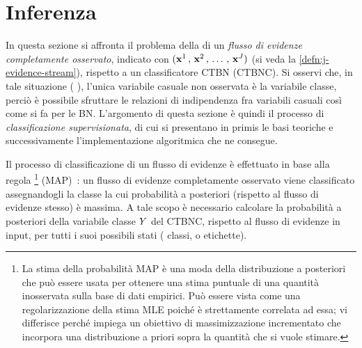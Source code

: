 \cleardoublepage
\section{Inferenza}\label{sec:inference-ctbnc}
In questa sezione si affronta il problema della \emph{} di un \emph{flusso di evidenze completamente osservato}, indicato con $(\mathbf{x}^1\,,\,\mathbf{x}^2\,,\,\dotsc\,,\,\mathbf{x}^{J})$ (si veda la \autoref{defn:j-evidence-stream}), rispetto a un classificatore \acs{CTBN} (\acs{CTBNC}). Si osservi che, in tale situazione (\ie{} \emph{}), l'unica variabile casuale non osservata è la variabile classe, perciò è possibile sfruttare le relazioni di indipendenza fra variabili casuali così come si fa per le \acl{BN}. L'argomento di questa sezione è quindi il processo di \emph{classificazione supervisionata}, di cui si presentano in primis le basi teoriche e successivamente l'implementazione algoritmica che ne consegue.

Il processo di classificazione di un flusso di evidenze è effettuato in base alla regola \emph{}\footnote{La stima della probabilità \acf{MAP} è una moda della distribuzione a posteriori che può essere usata per ottenere una stima puntuale di una quantità inosservata sulla base di dati empirici. Può essere vista come una regolarizzazione della stima \acf{MLE} poiché è strettamente correlata ad essa; vi differisce perché impiega un obiettivo di massimizzazione incrementato che incorpora una distribuzione a priori sopra la quantità che si vuole stimare.} (\acs{MAP})~\citep[si veda][]{Stella2012}: un flusso di evidenze completamente osservato viene classificato assegnandogli la classe la cui probabilità a posteriori (rispetto al flusso di evidenze stesso) è massima. A tale scopo è necessario calcolare la probabilità a posteriori della variabile classe $\mathnormal{Y}$ del \acs{CTBNC}, rispetto al flusso di evidenze in input, per tutti i suoi possibili stati (\ie{} classi, o etichette).

